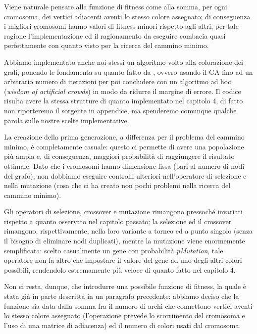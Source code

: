 Viene naturale pensare alla funzione di fitness come alla somma, per ogni cromosoma, dei vertici adiacenti aventi lo stesso colore assegnato; di conseguenza i migliori cromosomi hanno valori di fitness minori rispetto agli altri, per tale ragione l'implementazione ed il ragionamento da eseguire combacia quasi perfettamente con quanto visto per la ricerca del cammino minimo.
\vspace{3mm}

%
Abbiamo implementato anche noi stessi un algoritmo volto alla colorazione dei grafi, ponendo le fondamenta su quanto fatto da \cite{graphcol1}, ovvero usando il GA fino ad un arbitrario numero di iterazioni per poi concludere con un algoritmo ad hoc (\textit{wisdom of artificial crowds}) in modo da ridurre il margine di errore. Il codice risulta avere la stessa strutture di quanto implementato nel capitolo 4, di fatto non riporteremo il sorgente in appendice, ma spenderemo comunque qualche parola sulle nostre scelte implementative.
\vspace{3mm}

La creazione della prima generazione, a differenza per il problema del cammino minimo, \`e completamente casuale: questo ci permette di avere una popolazione pi\`u ampia e, di conseguenza, maggiori probabilit\`a di raggiungere il risultato ottimale. Dato che i cromosomi hanno dimensione fissa (pari al numero di nodi del grafo), non dobbiamo eseguire controlli ulteriori nell'operatore di selezione e nella mutazione (cosa che ci ha creato non pochi problemi nella ricerca del cammino minimo).
\vspace{3mm}

Gli operatori di selezione, crossover e mutazione rimangono pressoch\'e invariati rispetto a quanto osservato nel capitolo passato; la selezione ed il crossover rimangono, rispettivamente, nella loro variante a torneo ed a punto singolo (senza il bisogno di eliminare nodi duplicati), mentre la mutazione viene enormemente semplificata: scelto casualmente un gene con probabilit\`a \textit{pMutation}, tale operatore non fa altro che impostare il valore del gene ad uno degli altri colori possibili, rendendolo estremamente pi\`u veloce di quanto fatto nel capitolo 4.
\vspace{3mm}

Non ci resta, dunque, che introdurre una possibile funzione di fitness, la quale \`e stata gi\`a in parte descritta in un paragrafo precedente: abbiamo deciso che la funzione sia data dalla somma fra il numero di archi che connettono vertici aventi lo stesso colore assegnato (l'operazione prevede lo scorrimento del cromosoma e l'uso di una matrice di adiacenza) ed il numero di colori usati dal cromosoma.
\vspace{3mm}

